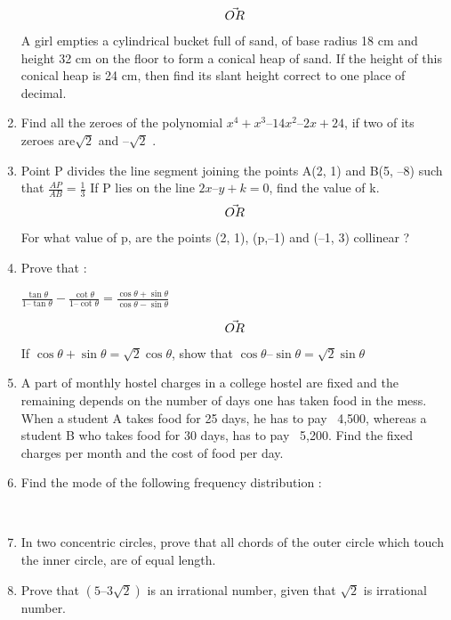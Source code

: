 \documentclass[journal,12pt,twocolumn]{IEEEtran}
\begin{document}
\begin{enumerate}
\begin{figure}[h!]
 \end{figure}
 \begin{align}
    \centering \vec{OR}\nonumber
\end{align}
A girl empties a cylindrical bucket full of sand, of base radius 18 cm and height 32 cm on the floor to form a conical heap of sand. If the height of this conical heap is 24 cm, then find its slant height correct to one place of decimal.
 \medskip
 \item Find all the zeroes of the polynomial $x^4 + x^3 – 14x^2 – 2x + 24$, if two of its zeroes are$\sqrt{2}$  and –$\sqrt{2}$  .
 \medskip
 \item Point P divides the line segment joining the points A(2, 1) and B(5, –8) such that
 $ \displaystyle\frac{AP}{AB}=\displaystyle\frac{1}{3}$ If P lies on the line $2x – y + k = 0$, find the value of k.
  \begin{align}
    \centering \vec{OR}\nonumber
\end{align}
For what value of p, are the points (2, 1), (p,–1) and (–1, 3) collinear ?\\
\item Prove that :
\begin{center}
 $ \displaystyle\frac{\tan\theta}{1 – \tan\theta} - \displaystyle\frac{\cot\theta}{1 – \cot\theta} = \displaystyle\frac{\cos\theta+\sin\theta}{\cos\theta - \sin\theta}$
\end{center}
  \begin{align}
    \centering \vec{OR}\nonumber
\end{align}
If $\cos\theta + \sin\theta=\sqrt{2} \cos\theta$, show that $\cos\theta – \sin\theta = \sqrt{2}\sin\theta$
 \medskip
\item A part of monthly hostel charges in a college hostel are fixed and the remaining depends on the number of days one has taken food in the mess. When a student A takes food for 25 days, he has to pay \rupee~4,500, whereas a student B who takes food for 30 days, has to pay \rupee~5,200. Find the fixed charges per month and the cost of food per day.\\
\item Find the mode of the following frequency distribution :
\begin{table}
\centering
\end{table}
\\
 \item In two concentric circles, prove that all chords of the outer circle which touch the inner circle, are of equal length.
 \medskip
 \item Prove that $(5 – 3\sqrt{2})$ is an irrational number, given that $\sqrt{2}$ is irrational number.
 \bigskip

\end{enumerate}
\end{document}
